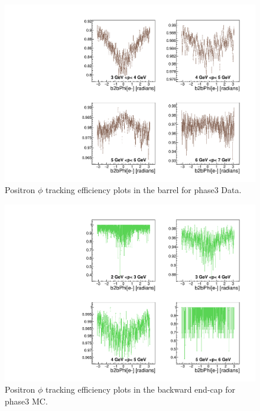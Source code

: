 \documentclass[a4paper,11pt,twosided,final,german,openbib,pdftex,listof=totoc,bibliography=totoc]{scrbook}
\begin{document}
\begin{appendix}
\begin{figure}[!htbp]
	\centering
	\includegraphics[width=\textwidth]{Plots/master3/xPMPhiepBarrel_DataP3}
	\caption[Momentum $\phi$ Positron Barrel Efficiency Phase3 Data]{Positron $\phi$ tracking efficiency plots in the barrel for phase3 Data.}
	\label{plt:PMPhiepBarrel3_Data}
\end{figure}





\begin{figure}[!htbp]
	\centering
	\includegraphics[width=\textwidth]{Plots/master3/xPMPhiepEC_MCP3}
	\caption[Momentum $\phi$ Positron Backward End-Cap Efficiency Phase3 MC]{Positron $\phi$ tracking efficiency plots in the backward end-cap for phase3 MC.}
	\label{plt:PMPhiepEC3_MC}
\end{figure}



\end{appendix}
\end{document}
